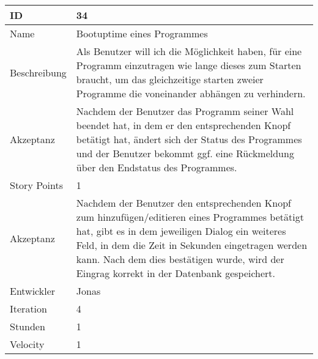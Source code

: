 \begin{table}[htbp]
\begin{minipage}{\linewidth}
\setlength{\tymax}{0.5\linewidth}
\centering
\small
\begin{tabulary}{\textwidth}{|l|p{10cm}|} \hline
 ID   &34\\\hline


Name  &Bootuptime eines Programmes\\\hline
Beschreibung&Als Benutzer will ich die Möglichkeit haben, für eine Programm einzutragen wie lange dieses zum Starten braucht, um das gleichzeitige starten zweier Programme die voneinander abhängen zu verhindern.\\\hline
Akzeptanz &Nachdem der Benutzer das Programm seiner Wahl beendet hat, in dem er den entsprechenden Knopf betätigt hat, ändert sich der Status des Programmes und der Benutzer bekommt ggf. eine Rückmeldung über den Endstatus des Programmes.\\\hline
Story Points&1\\\hline
Akzeptanz &Nachdem der Benutzer den entsprechenden Knopf zum hinzufügen\slash editieren eines Programmes betätigt hat, gibt es in dem jeweiligen Dialog ein weiteres Feld, in dem die Zeit in Sekunden eingetragen werden kann. Nach dem dies bestätigen wurde, wird der Eingrag korrekt in der Datenbank gespeichert.\\\hline
Entwickler &Jonas\\\hline
Iteration &4\\\hline
Stunden  &1\\\hline
Velocity &1\\\hline
\end{tabulary}
\end{minipage}
\end{table}



